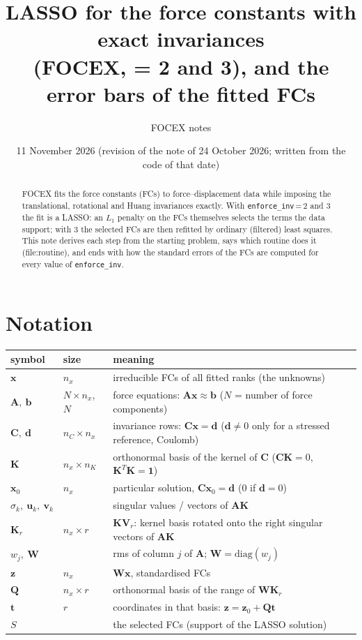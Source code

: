 \documentclass[11pt,a4paper]{article}
\title{LASSO for the force constants with exact invariances\\(FOCEX, \code{enforce\_inv} = 2 and 3), and the error bars of the fitted FCs}
\author{FOCEX notes}
\date{11 November 2026 (revision of the note of 24 October 2026; written from the code of that date)}
\newcommand{\bA}{\mathbf A}
\newcommand{\bC}{\mathbf C}
\newcommand{\bK}{\mathbf K}
\newcommand{\bQ}{\mathbf Q}
\newcommand{\bV}{\mathbf V}
\newcommand{\bW}{\mathbf W}
\newcommand{\bb}{\mathbf b}
\newcommand{\bd}{\mathbf d}
\newcommand{\bt}{\mathbf t}
\newcommand{\bu}{\mathbf u}
\newcommand{\bv}{\mathbf v}
\newcommand{\bx}{\mathbf x}
\newcommand{\bz}{\mathbf z}
\newcommand{\code}[1]{\texttt{#1}}
\begin{document}
\maketitle

\begin{abstract}
FOCEX fits the force constants (FCs) to force--displacement data while imposing the translational,
rotational and Huang invariances exactly. With \code{enforce\_inv}\,=\,2 and 3 the fit is a LASSO: an
$L_1$ penalty on the FCs themselves selects the terms the data support; with 3 the selected FCs are then
refitted by ordinary (filtered) least squares. This note derives each step from the starting problem,
says which routine does it (file:routine), and ends with how the standard errors of the FCs are
computed for every value of \code{enforce\_inv}.
\end{abstract}

\section*{Notation}
\begin{center}\small
\begin{tabular}{lll}
\toprule
symbol & size & meaning \\
\midrule
$\bx$ & $n_x$ & irreducible FCs of all fitted ranks (the unknowns) \\
$\bA,\ \bb$ & $N\times n_x$, $N$ & force equations: $\bA\bx\approx\bb$ ($N$ = number of force components) \\
$\bC,\ \bd$ & $n_C\times n_x$ & invariance rows: $\bC\bx=\bd$ ($\bd\ne0$ only for a stressed reference, Coulomb) \\
$\bK$ & $n_x\times n_K$ & orthonormal basis of the kernel of $\bC$ ($\bC\bK=0$, $\bK^T\bK=\mathbf 1$) \\
$\bx_0$ & $n_x$ & particular solution, $\bC\bx_0=\bd$ (0 if $\bd=0$) \\
$\sigma_k,\ \bu_k,\ \bv_k$ & & singular values / vectors of $\bA\bK$ \\
$\bK_r$ & $n_x\times r$ & $\bK\bV_r$: kernel basis rotated onto the right singular vectors of $\bA\bK$ \\
$w_j,\ \bW$ & & rms of column $j$ of $\bA$; $\bW=\mathrm{diag}(w_j)$ \\
$\bz$ & $n_x$ & $\bW\bx$, standardised FCs \\
$\bQ$ & $n_x\times r$ & orthonormal basis of the range of $\bW\bK_r$ \\
$\bt$ & $r$ & coordinates in that basis: $\bz=\bz_0+\bQ\bt$ \\
$S$ & & the selected FCs (support of the LASSO solution) \\
\bottomrule
\end{tabular}
\end{center}
\end{document}
